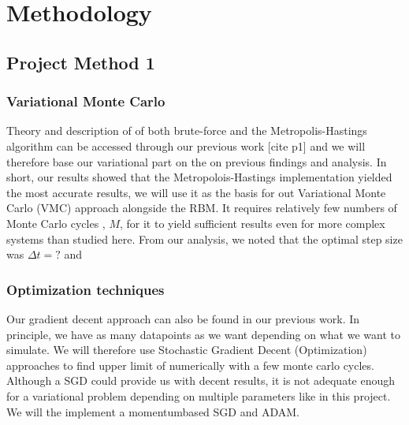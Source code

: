 \section{Methodology}\label{sec:Method}

\subsection{Project Method 1}\label{sec:project method}

\subsubsection{Variational Monte Carlo}

Theory and description of of both brute-force and the Metropolis-Hastings algorithm can be accessed through our previous work [cite p1] and we will therefore base our variational part on the on previous findings and analysis. In short, our results showed that the Metropolois-Hastings implementation yielded the most accurate results, we will use it as the basis for out Variational Monte Carlo (VMC) approach alongside the RBM. It requires relatively few numbers of Monte Carlo cycles , $M$, for it to yield sufficient results even for more complex systems than studied here. From our analysis, we noted that the optimal step size was $\Delta t = ?$ and 


\subsubsection{Optimization techniques}

Our gradient decent approach can also be found in our previous work. In principle, we have as many datapoints as we want depending on what we want to simulate. We will therefore use Stochastic Gradient Decent (Optimization) approaches to find upper limit of numerically with a few monte carlo cycles. Although a SGD could provide us with decent results, it is not adequate enough for a variational problem depending on multiple parameters like in this project. We will the implement a momentumbased SGD and ADAM. 

